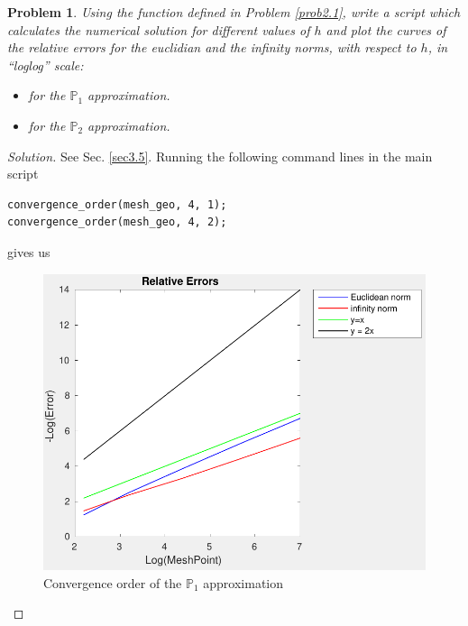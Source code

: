 \documentclass[11pt,a4paper,center,notitlepage]{article}
\numberwithin{equation}{section}
\newtheorem{prob}{Problem}[section]
\begin{document}
\begin{prob}
Using the function defined in Problem \ref{prob2.1}, write a script which calculates the numerical solution for different values of $h$ and plot the curves of the relative errors for the euclidian and the infinity norms, with respect to $h$, in ``loglog'' scale:
\begin{itemize}
\item[(a)] for the $\mathbb{P}_1$ approximation.
\item[(b)] for the $\mathbb{P}_2$ approximation.
\end{itemize}
\end{prob}

\begin{proof}[Solution]
See Sec. \ref{sec3.5}. Running the following command lines in the main script
\begin{verbatim}
convergence_order(mesh_geo, 4, 1);
convergence_order(mesh_geo, 4, 2);
\end{verbatim}
gives us 
\begin{figure}[H]
\centering
\includegraphics[scale=0.9]{convergence_order_P1}
\caption{Convergence order of the $\mathbb{P}_1$ approximation}
\end{figure}


\end{proof}
\end{document}
